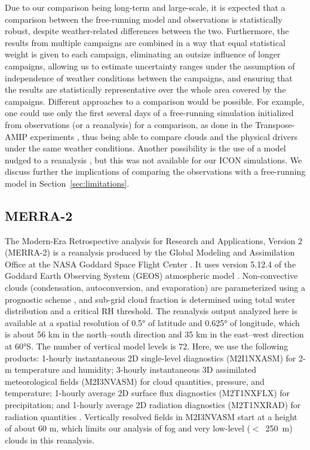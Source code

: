 \documentclass[draft]{agujournal2019}
\begin{document}
Due to our comparison being long-term and large-scale, it is expected that a comparison between the free-running model and observations is statistically robust, despite weather-related differences between the two. Furthermore, the results from multiple campaigns are combined in a way that equal statistical weight is given to each campaign, eliminating an outsize influence of longer campaigns, allowing us to estimate uncertainty ranges under the assumption of independence of weather conditions between the campaigns, and ensuring that the results are statistically representative over the whole area covered by the campaigns. Different approaches to a comparison would be possible. For example, one could use only the first several days of a free-running simulation initialized from observations (or a reanalysis) for a comparison, as done in the Transpose-AMIP experiments \cite{williams2013}, thus being able to compare clouds and the physical drivers under the same weather conditions. Another possibility is the use of a model nudged to a reanalysis \cite{kuma2020}, but this was not available for our ICON simulations. We discuss further the implications of comparing the observations with a free-running model in Section~\ref{sec:limitations}.

\subsection{MERRA-2}

The Modern-Era Retrospective analysis for Research and Applications, Version 2 (MERRA-2) is a reanalysis produced by the Global Modeling and Assimilation Office at the NASA Goddard Space Flight Center \cite{gelaro2017}. It uses version 5.12.4 of the Goddard Earth Observing System (GEOS) atmospheric model \cite{rienecker2008,molod2015}. Non-convective clouds (condensation, autoconversion, and evaporation) are parameterized using a prognostic scheme \cite{bacmeister2006}, and sub-grid cloud fraction is determined using total water distribution and a critical RH threshold. The reanalysis output analyzed here is available at a spatial resolution of 0.5° of latitude and 0.625° of longitude, which is about 56 km in the north–south direction and 35 km in the east–west direction at 60°S. The number of vertical model levels is 72. Here, we use the following products: 1-hourly instantaneous 2D single-level diagnostics (M2I1NXASM) for 2-m temperature and humidity; 3-hourly instantaneous 3D assimilated meteorological fields (M2I3NVASM) for cloud quantities, pressure, and temperature; 1-hourly average 2D surface flux diagnostics (M2T1NXFLX) for precipitation; and 1-hourly average 2D radiation diagnostics (M2T1NXRAD) for radiation quantities \cite{merra2}. Vertically resolved fields in M2I3NVASM start at a height of about 60 m, which limits our analysis of fog and very low-level ($<$~250~m) clouds in this reanalysis.
\end{document}
